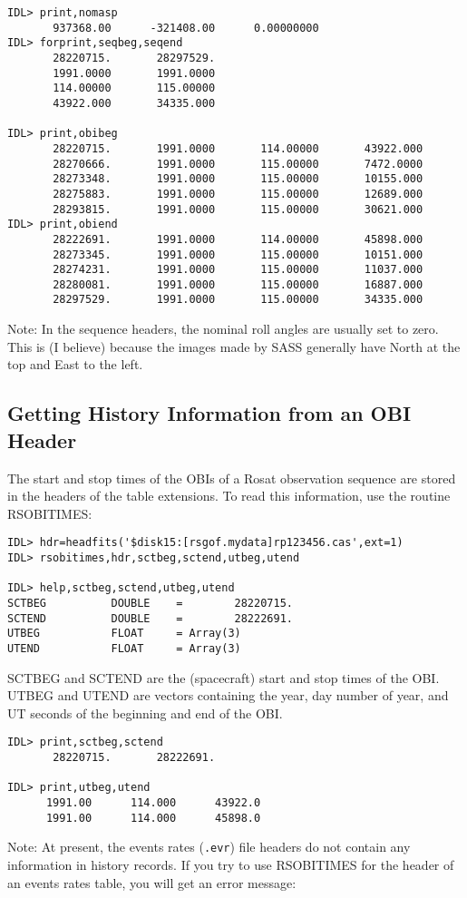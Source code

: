 \medskip\noindent
\begin{verbatim}
IDL> print,nomasp
       937368.00      -321408.00      0.00000000
IDL> forprint,seqbeg,seqend
       28220715.       28297529.
       1991.0000       1991.0000
       114.00000       115.00000
       43922.000       34335.000
 
IDL> print,obibeg
       28220715.       1991.0000       114.00000       43922.000
       28270666.       1991.0000       115.00000       7472.0000
       28273348.       1991.0000       115.00000       10155.000
       28275883.       1991.0000       115.00000       12689.000
       28293815.       1991.0000       115.00000       30621.000
IDL> print,obiend
       28222691.       1991.0000       114.00000       45898.000
       28273345.       1991.0000       115.00000       10151.000
       28274231.       1991.0000       115.00000       11037.000
       28280081.       1991.0000       115.00000       16887.000
       28297529.       1991.0000       115.00000       34335.000
\end{verbatim}
Note: In the sequence headers, the nominal roll angles are usually set to zero.
This is (I believe) because the images made by SASS generally have North at the
top and East to the left.
 

\subsection{Getting History Information from an OBI Header}
 
The start and stop times of the OBIs of a Rosat observation sequence are stored
in the headers of the table extensions. To read this information, use the
routine RSOBITIMES:

\medskip\noindent
\begin{verbatim}
IDL> hdr=headfits('$disk15:[rsgof.mydata]rp123456.cas',ext=1)
IDL> rsobitimes,hdr,sctbeg,sctend,utbeg,utend
 
IDL> help,sctbeg,sctend,utbeg,utend
SCTBEG          DOUBLE    =        28220715.
SCTEND          DOUBLE    =        28222691.
UTBEG           FLOAT     = Array(3)
UTEND           FLOAT     = Array(3)
\end{verbatim}
SCTBEG and SCTEND are the (spacecraft) start and stop times of the OBI. UTBEG
and UTEND are vectors containing the year, day number of year, and UT seconds
of the beginning and end of the OBI.

\medskip\noindent
\begin{verbatim}
IDL> print,sctbeg,sctend
       28220715.       28222691.
 
IDL> print,utbeg,utend
      1991.00      114.000      43922.0
      1991.00      114.000      45898.0
\end{verbatim}
Note: At present, the events rates ({\tt .evr}) file headers do not contain any
information in history records. If you try to use RSOBITIMES for the header of
an events rates table, you will get an error message:


